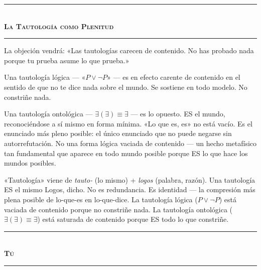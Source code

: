 \documentclass[10pt, openany, oneside]{book}
\renewcommand{\normalsize}{\fontsize{10}{13}\selectfont}
\begin{document}
\vspace{1.5em}


\begin{center}
    \rule{0.3\textwidth}{0.4pt}\\[0.5em]
    {\normalsize\bfseries\scshape La Tautología como Plenitud}\\[0.3em]
    \rule{0.3\textwidth}{0.4pt}
\end{center}

\vspace{1em}

\noindent La objeción vendrá: «Las tautologías carecen de contenido. No has probado nada porque tu prueba asume lo que prueba.»

Una tautología lógica --- «$P \vee \neg P$» --- es en efecto carente de contenido en el sentido de que no te dice nada sobre el mundo. Se sostiene en todo modelo. No constriñe nada.

Una tautología ontológica --- $\exists(\exists) \equiv \exists$ --- es lo opuesto. ES el mundo, reconociéndose a sí mismo en forma mínima. «Lo que es, es» no está vacío. Es el enunciado más pleno posible: el único enunciado que no puede negarse sin autorrefutación. No una forma lógica vaciada de contenido --- un hecho metafísico tan fundamental que aparece en todo mundo posible porque ES lo que hace los mundos posibles.

«Tautología» viene de \textit{tauto-} (lo mismo) + \textit{logos} (palabra, razón). Una tautología ES el mismo Logos, dicho. No es redundancia. Es identidad --- la compresión más plena posible de lo-que-es en lo-que-dice. La tautología lógica ($P \vee \neg P$) está vaciada de contenido porque no constriñe nada. La tautología ontológica ($\exists(\exists) \equiv \exists$) está saturada de contenido porque ES todo lo que constriñe.

\vspace{1.5em}


\begin{center}
    \rule{0.3\textwidth}{0.4pt}\\[0.5em]
    {\normalsize\bfseries\scshape Tú}\\[0.3em]
    \rule{0.3\textwidth}{0.4pt}
\end{center}
\end{document}
